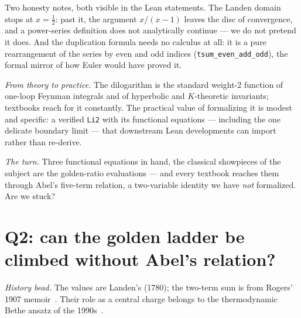 \documentclass[11pt]{article}
\newcommand{\lean}[1]{\texttt{#1}}
\begin{document}
Two honesty notes, both visible in the Lean statements. The Landen domain stops at
$x=\frac12$: past it, the argument $x/(x-1)$ leaves the disc of convergence, and a
power-series definition does not analytically continue --- we do not pretend it does.
And the duplication formula needs no calculus at all: it is a pure rearrangement of the
series by even and odd indices (\lean{tsum\_even\_add\_odd}), the formal mirror of how
Euler would have proved it.

\emph{From theory to practice.} The dilogarithm is the standard weight-2 function of
one-loop Feynman integrals and of hyperbolic and $K$-theoretic invariants; textbooks
reach for it constantly. The practical value of formalizing it is modest and specific:
a verified \lean{Li2} with its functional equations --- including the one delicate
boundary limit --- that downstream Lean developments can import rather than re-derive.

\emph{The turn.} Three functional equations in hand, the classical showpieces of the
subject are the golden-ratio evaluations --- and every textbook reaches them through
Abel's five-term relation, a two-variable identity we have \emph{not} formalized.
Are we stuck?

\section{Q2: can the golden ladder be climbed without Abel's relation?}
\label{sec:golden}

\emph{History bead.} The values are Landen's (1780); the two-term sum is from Rogers'
1907 memoir~\cite{rogers}. Their role as a central charge belongs to the thermodynamic
Bethe ansatz of the 1990s~\cite{zamolodchikov,nahm,kirillov}.
\end{document}
